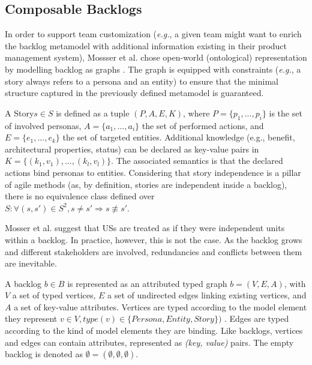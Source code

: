 \subsection*{Composable Backlogs}
In order to support team customization (\emph{e.g.}, a given team might want to enrich the backlog metamodel with additional information existing in their product management system), Mossser et al. chose open-world (ontological) representation by modelling backlog as graphs \cite{mosser2022modelling}. The graph is equipped with constraints (\emph{e.g.}, a story always refers to a persona and an entity) to ensure that the minimal structure captured in the previously defined metamodel is guaranteed.
\begin{definition}
A Story$s \in S$ is defined as a tuple $\left(P,A,E,K\right)$, where $P=\{p_1, ..., p_i\}$ is the set of involved personas, $A= \{a_1, ..., a_i\}$ the set of performed actions, and $E = \{e_1, ..., e_k\}$ the set of targeted entities. Additional knowledge (e.g., benefit, architectural properties, status) can be declared as key-value pairs in $K = \{(k_1,v_1), ..., (k_l,v_l)\}$. The associated semantics is that the declared actions bind personas to entities. Considering that story independence is a pillar of agile methods (as, by definition, stories are independent inside a backlog), there is no equivalence class defined over \\
$S: \forall (s,s')\in S^2, s\neq s' \Rightarrow s \not \equiv s'$.
\end{definition}
Mosser et al. suggest that USs are treated as if they were independent units within a backlog. In practice, however, this is not the case. As the backlog grows and different stakeholders are involved, redundancies and conflicts between them are inevitable.
\begin{definition}
A backlog $b \in B$ is represented as an attributed typed graph $b = (V, E, A)$, with $V$ a set of typed vertices, $E$ a set of undirected edges linking existing vertices, and $A$ a set of key-value attributes. Vertices are typed according to the model element they represent $v \in V, type(v) \in \{ Persona, Entity, Story \} )$ . Edges are typed according to the kind of model elements they are binding. Like backlogs, vertices and edges can contain attributes, represented as \emph{(key, value)} pairs. The empty backlog is denoted as $\emptyset = (\emptyset ,\emptyset ,\emptyset )$.
\end{definition}
